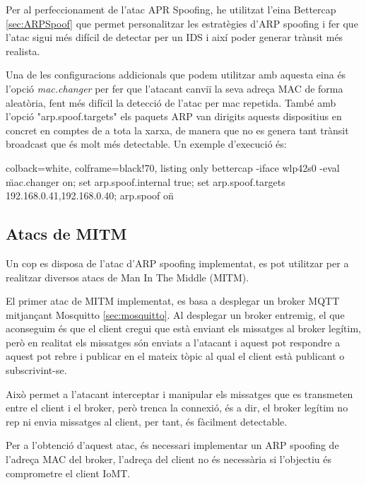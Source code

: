 Per al perfeccionament de l'atac APR Spoofing, he utilitzat l'eina Bettercap \ref{sec:ARPSpoof} que permet personalitzar les estratègies d'ARP spoofing i fer que l'atac sigui més difícil de detectar per un IDS i així poder generar trànsit més realista. 

Una de les configuracions addicionals que podem utilitzar amb aquesta eina és l'opció \textit{mac.changer} per fer que l'atacant canviï la seva adreça MAC de forma aleatòria, fent més difícil la detecció de l'atac per mac repetida. També amb l'opció "arp.spoof.targets" els paquets ARP van dirigits aquests dispositius en concret en comptes de a tota la xarxa, de manera que no es genera tant trànsit broadcast que és molt més detectable. Un exemple d'execució és:

\begin{tcblisting}{colback=white, colframe=black!70, listing only}
bettercap -iface wlp42s0 -eval \"mac.changer on; set arp.spoof.internal true; set arp.spoof.targets 192.168.0.41,192.168.0.40; arp.spoof on\" 
\end{tcblisting}

\subsection{Atacs de MITM}

Un cop es disposa de l'atac d'ARP spoofing implementat, es pot utilitzar per a realitzar diversos atacs de Man In The Middle (MITM). 

El primer atac de MITM implementat, es basa a desplegar un broker MQTT mitjançant Mosquitto \ref{sec:mosquitto}. Al desplegar un broker entremig, el que aconseguim és que el client cregui que està enviant els missatges al broker legítim, però en realitat els missatges són enviats a l'atacant i aquest pot respondre a aquest pot rebre i publicar en el mateix tòpic al qual el client està publicant o subscrivint-se.

Això permet a l'atacant interceptar i manipular els missatges que es transmeten entre el client i el broker, però trenca la connexió, és a dir, el broker legítim no rep ni envia missatges al client, per tant, és fàcilment detectable.

Per a l'obtenció d'aquest atac, és necessari implementar un ARP spoofing de l'adreça MAC del broker, l'adreça del client no és necessària si l'objectiu és comprometre el client IoMT. 

